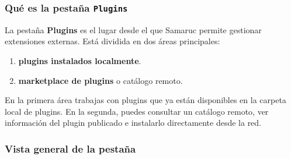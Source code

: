 \documentclass[../../main.tex]{subfiles}
\begin{document}
\subsubsection{Qué es la pestaña \texttt{Plugins}}

La pestaña \textbf{Plugins} es el lugar desde el que Samaruc permite gestionar extensiones externas. Está dividida en dos áreas principales:

\begin{enumerate}
    \item \textbf{plugins instalados localmente}.
    \item \textbf{marketplace de plugins} o catálogo remoto.
\end{enumerate}

En la primera área trabajas con plugins que ya están disponibles en la carpeta local de plugins. En la segunda, puedes consultar un catálogo remoto, ver información del plugin publicado e instalarlo directamente desde la red.

\subsubsection{Vista general de la pestaña}
\end{document}

